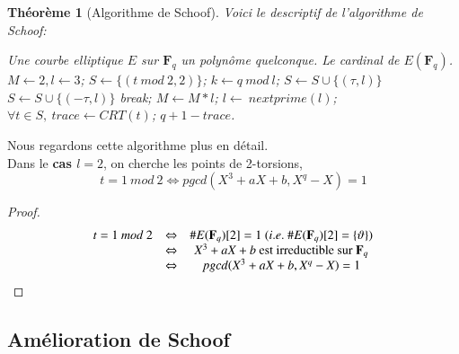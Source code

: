 \documentclass{article}%
\theoremstyle{plain}
\newtheorem{theoreme}{Théorème}[section]
\theoremstyle{definition}
\theoremstyle{plain}
\theoremstyle{plain}
\theoremstyle{remark}
\newcommand\fq{\mathbf{F}_{q}}
\begin{document}
\begin{theoreme}[Algorithme de Schoof]
Voici le descriptif de l’algorithme de Schoof:

\begin{algorithm}
\caption{Algorithme de Shoof}
\label{schoof1}
\begin{algorithmic} 
\REQUIRE Une courbe elliptique $E$ sur $\fq$ un polynôme quelconque.
\ENSURE Le cardinal de $E(\fq)$.
\STATE $M\leftarrow 2, l\leftarrow 3$;
\STATE $S\leftarrow \{(t\ mod\ 2, 2)\}$; 
    \STATE $k\leftarrow q\ mod\ l$;	
            \STATE $S\leftarrow S\cup \{(\tau, l)\}$ \OR $S\leftarrow S\cup \{(-\tau, l)\}$ 
            \STATE break;
        \ENDIF
    \ENDFOR
    \STATE $M\leftarrow M*l$;
    \STATE $l\leftarrow\ nextprime(l)$; 	
\ENDWHILE
\STATE $\forall t\in S,\ trace\leftarrow CRT(t)$; 
\RETURN $q + 1 - trace$.
\end{algorithmic}
\end{algorithm}
\end{theoreme}


Nous regardons cette algorithme plus en détail.\\

Dans le \textbf{cas $l = 2$}, on cherche les points de 2-torsions, 
\begin{equation}
t=1\ mod\ 2\Leftrightarrow pgcd(X^{3} + aX + b, X^{q} - X) = 1
\label{cas2}
\end{equation}
\begin{proof}
$$
\begin{array}{cl cl}
t=1\ mod\ 2 &\Leftrightarrow& \#E(\fq)[2] = 1\ (i.e.\ \#E(\fq)[2]=\{\vartheta\})\\
&\Leftrightarrow& X^{3} + aX + b\text{ est irreductible sur }\fq\\
&\Leftrightarrow& pgcd(X^{3} + aX + b, X^{q} - X) = 1
\end{array}
$$
\end{proof}








\subsection{Amélioration de Schoof}
\end{document}
